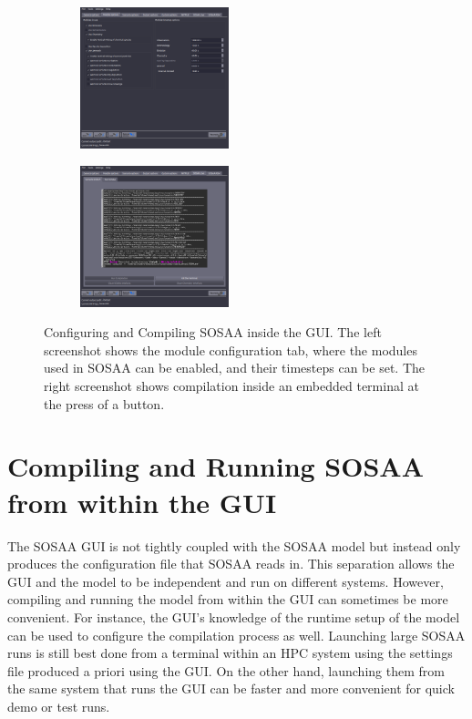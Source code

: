 \begin{figure}[H]
    \centering
    \begin{subfigure}
        \centering
        \includegraphics[width=0.475\textwidth]{sosaa-gui/figures/sosaa-modules.png}
    \end{subfigure}
    \begin{subfigure}
        \centering
        \includegraphics[width=0.475\textwidth]{sosaa-gui/figures/sosaa-compile.png}
    \end{subfigure}

    \caption[Configuring and Compiling SOSAA inside the GUI]{Configuring and Compiling SOSAA inside the GUI. The left screenshot shows the module configuration tab, where the modules used in SOSAA can be enabled, and their timesteps can be set. The right screenshot shows compilation inside an embedded terminal at the press of a button.}
    \label{fig:sosaa-gui-modules-compile}
\end{figure}

\section{Compiling and Running SOSAA from within the GUI} \label{txt:sosaa-gui-compile-run}

The SOSAA GUI is not tightly coupled with the SOSAA model but instead only produces the configuration file that SOSAA reads in. This separation allows the GUI and the model to be independent and run on different systems. However, compiling and running the model from within the GUI can sometimes be more convenient. For instance, the GUI's knowledge of the runtime setup of the model can be used to configure the compilation process as well. Launching large SOSAA runs is still best done from a terminal within an HPC system using the settings file produced a priori using the GUI. On the other hand, launching them from the same system that runs the GUI can be faster and more convenient for quick demo or test runs.

